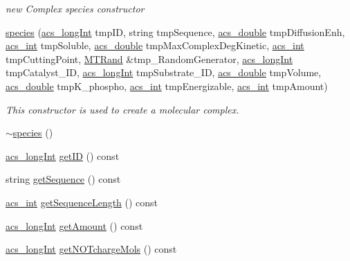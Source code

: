 \begin{DoxyCompactItemize}
\begin{DoxyCompactList}\small\item\em new Complex species constructor \end{DoxyCompactList}\item 
\hyperlink{a00021_a492478eb509138dff0be715a70d741ac}{species} (\hyperlink{a00050_a19319d75f02db4308bc5c0026d98cd85}{acs\+\_\+long\+Int} tmp\+I\+D, string tmp\+Sequence, \hyperlink{a00050_ab776853a005fcbf56af0424a2a4dd607}{acs\+\_\+double} tmp\+Diffusion\+Enh, \hyperlink{a00050_a8d277355641a098190360234e2ebde35}{acs\+\_\+int} tmp\+Soluble, \hyperlink{a00050_ab776853a005fcbf56af0424a2a4dd607}{acs\+\_\+double} tmp\+Max\+Complex\+Deg\+Kinetic, \hyperlink{a00050_a8d277355641a098190360234e2ebde35}{acs\+\_\+int} tmp\+Cutting\+Point, \hyperlink{a00015}{M\+T\+Rand} \&tmp\+\_\+\+Random\+Generator, \hyperlink{a00050_a19319d75f02db4308bc5c0026d98cd85}{acs\+\_\+long\+Int} tmp\+Catalyst\+\_\+\+I\+D, \hyperlink{a00050_a19319d75f02db4308bc5c0026d98cd85}{acs\+\_\+long\+Int} tmp\+Substrate\+\_\+\+I\+D, \hyperlink{a00050_ab776853a005fcbf56af0424a2a4dd607}{acs\+\_\+double} tmp\+Volume, \hyperlink{a00050_ab776853a005fcbf56af0424a2a4dd607}{acs\+\_\+double} tmp\+K\+\_\+phospho, \hyperlink{a00050_a8d277355641a098190360234e2ebde35}{acs\+\_\+int} tmp\+Energizable, \hyperlink{a00050_a8d277355641a098190360234e2ebde35}{acs\+\_\+int} tmp\+Amount)
\begin{DoxyCompactList}\small\item\em This constructor is used to create a molecular complex. \end{DoxyCompactList}\item 
\hyperlink{a00021_a4ec3e21535ff68a06dba4e1eed935dc0}{$\sim$species} ()
\item 
\hyperlink{a00050_a19319d75f02db4308bc5c0026d98cd85}{acs\+\_\+long\+Int} \hyperlink{a00021_a59f2a9963c10fcb3748153c73c9c7072}{get\+I\+D} () const 
\item 
string \hyperlink{a00021_a553019883dd1344a7f15b805453e46d1}{get\+Sequence} () const 
\item 
\hyperlink{a00050_a8d277355641a098190360234e2ebde35}{acs\+\_\+int} \hyperlink{a00021_ade5b59eab17c02ff322dcf068f923f9d}{get\+Sequence\+Length} () const 
\item 
\hyperlink{a00050_a19319d75f02db4308bc5c0026d98cd85}{acs\+\_\+long\+Int} \hyperlink{a00021_a53c74ca3861c4cdac2457e7057fbef21}{get\+Amount} () const 
\item 
\hyperlink{a00050_a19319d75f02db4308bc5c0026d98cd85}{acs\+\_\+long\+Int} \hyperlink{a00021_af7293ab371ab92d6d16866ea281e901a}{get\+N\+O\+Tcharge\+Mols} () const 

\end{DoxyCompactItemize}
